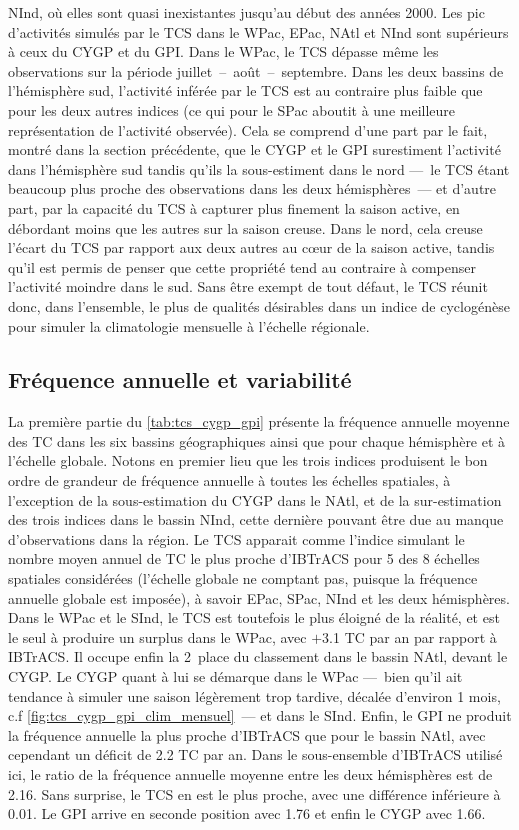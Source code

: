 \documentclass[../main.tex]{subfiles}
\begin{document}
NInd, où elles sont quasi inexistantes jusqu'au début des années 2000. Les pic d'activités simulés par le TCS dans le WPac, EPac, NAtl et NInd sont
supérieurs à ceux du CYGP et du GPI. Dans le WPac, le TCS dépasse même les observations sur la période juillet~--~août~--~septembre. Dans les deux bassins de
l'hémisphère sud, l'activité inférée par le TCS est au contraire plus faible que pour les deux autres indices (ce qui pour le SPac aboutit à une meilleure
représentation de l'activité observée). Cela se comprend d'une part par le fait, montré dans la section précédente, que le CYGP et le GPI surestiment l'activité
dans l'hémisphère sud tandis qu'ils la sous-estiment dans le nord ---~le TCS étant beaucoup plus proche des observations dans les deux hémisphères~--- et
d'autre part, par la capacité du TCS à capturer plus finement la saison active, en débordant moins que les autres sur la saison creuse. Dans le nord, cela
creuse l'écart du TCS par rapport aux deux autres au cœur de la saison active, tandis qu'il est permis de penser que cette propriété tend au contraire à
compenser l'activité moindre dans le sud. Sans être exempt de tout défaut, le TCS réunit donc, dans l'ensemble, le plus de qualités désirables dans un indice de
cyclogénèse pour simuler la climatologie mensuelle à l'échelle régionale.
\subsection*{Fréquence annuelle et variabilité}

La première partie du \cref{tab:tcs_cygp_gpi} présente la fréquence annuelle moyenne des TC dans les six bassins géographiques ainsi que pour chaque hémisphère et à
l'échelle globale. Notons en premier lieu que les trois indices produisent le bon ordre de grandeur de fréquence annuelle à toutes les échelles spatiales, à
l'exception de la sous-estimation du CYGP dans le NAtl, et de la sur-estimation des trois indices dans le bassin NInd, cette dernière pouvant être due au manque
d'observations dans la région. Le TCS apparait comme l'indice simulant le nombre moyen annuel de TC le plus proche d'IBTrACS pour \num{5} des \num{8} échelles
spatiales considérées (l'échelle globale ne comptant pas, puisque la fréquence annuelle globale est imposée), à savoir EPac, SPac, NInd et les deux
hémisphères. Dans le WPac et le SInd, le TCS est toutefois le plus éloigné de la réalité, et est le seul à produire un surplus dans le WPac, avec $+$\num{3.1}
TC par an par rapport à IBTrACS. Il occupe enfin la 2\ieme~place du classement dans le bassin NAtl, devant le CYGP. Le CYGP quant à lui se démarque dans le WPac
---~bien qu'il ait tendance à simuler une saison légèrement trop tardive, décalée d'environ 1 mois, c.f \cref{fig:tcs_cygp_gpi_clim_mensuel}~--- et dans le
SInd. Enfin, le GPI ne produit la fréquence annuelle la plus proche d'IBTrACS que pour le bassin NAtl, avec cependant un déficit de \num{2.2} TC par an. Dans le
sous-ensemble d'IBTrACS utilisé ici, le ratio de la fréquence annuelle moyenne entre les deux hémisphères est de \num{2.16}. Sans surprise, le TCS en est le
plus proche, avec une différence inférieure à \num{0.01}. Le GPI arrive en seconde position avec \num{1.76} et enfin le CYGP avec \num{1.66}.
\end{document}
